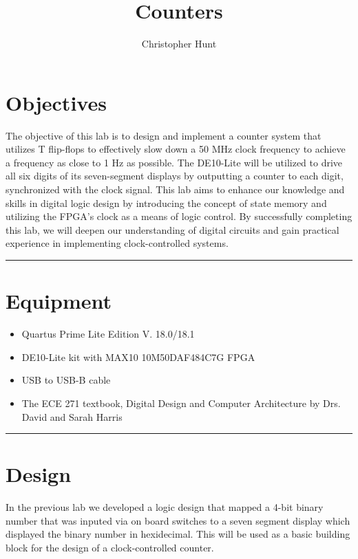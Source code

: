 \documentclass{article}
\title{\textbf{{\huge Counters}}}
\author{Christopher Hunt}
\date{}
\begin{document}
\pagestyle{fancy}
\fancyhf{}
\rhead{\thepage}
\maketitle
\section*{\textcolor{mycolor}{Objectives}}
The objective of this lab is to design and implement a counter system that utilizes T flip-flops to effectively slow down a 50 MHz clock frequency to achieve a frequency as close to 1 Hz as possible. The DE10-Lite will be utilized to drive all six digits of its seven-segment displays by outputting a counter to each digit, synchronized with the clock signal. This lab aims to enhance our knowledge and skills in digital logic design by introducing the concept of state memory and utilizing the FPGA's clock as a means of logic control. By successfully completing this lab, we will deepen our understanding of digital circuits and gain practical experience in implementing clock-controlled systems.

\vspace{5mm}
\hrule

\section*{\textcolor{mycolor}{Equipment}}
\begin{itemize}
  \item Quartus Prime Lite Edition V. 18.0/18.1
  \item DE10-Lite kit with MAX10 10M50DAF484C7G FPGA
  \item USB to USB-B cable
  \item The ECE 271 textbook, Digital Design and Computer Architecture by Drs. David and Sarah Harris
\end{itemize}
\vspace{5mm}
\hrule

\section*{\textcolor{mycolor}{Design}}
In the previous lab we developed a logic design that mapped a 4-bit binary number that was inputed via on board switches to a seven segment display which displayed the binary number in hexidecimal. This will be used as a basic building block for the design of a clock-controlled counter.
\end{document}
